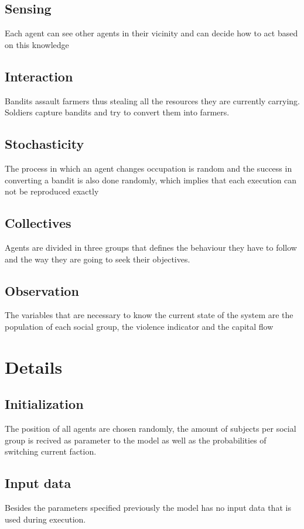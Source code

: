\documentclass{article}
\begin{document}
\subsection{Sensing}
Each agent can see other agents in their vicinity and can decide how to act
based on this knowledge

\subsection{Interaction}
Bandits assault farmers thus stealing all the resources they are currently
carrying. Soldiers capture bandits and try to convert them into farmers.

\subsection{Stochasticity}
The process in which an agent changes occupation is random and the success in
converting a bandit is also done randomly, which implies that each execution can
not be reproduced exactly

\subsection{Collectives}
Agents are divided in three groups that defines the behaviour they have to follow
and the way they are going to seek their objectives.

\subsection{Observation}
The variables that are necessary to know the current state of the system are
the population of each social group, the violence indicator and the capital flow

\section{Details}

\subsection{Initialization}
The position of all agents are chosen randomly, the amount of subjects per
social group is recived as parameter to the model as well as the probabilities
of switching current faction.

\subsection{Input data}
Besides the parameters specified previously the model has no input data that
is used during execution.
\end{document}
